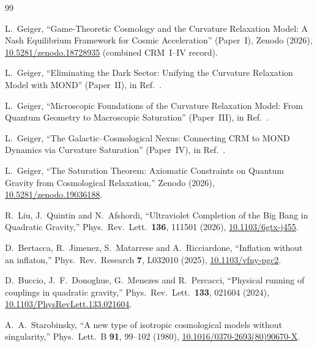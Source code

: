 \documentclass[aps,prd,twocolumn,superscriptaddress,nofootinbib]{revtex4-2}
\begin{document}
\begin{thebibliography}{99}

L.~Geiger,
``Game-Theoretic Cosmology and the Curvature Relaxation Model: A Nash Equilibrium Framework for Cosmic Acceleration'' (Paper~I),
Zenodo (2026), \href{https://doi.org/10.5281/zenodo.18728935}{10.5281/zenodo.18728935} (combined CRM~I--IV record).

L.~Geiger,
``Eliminating the Dark Sector: Unifying the Curvature Relaxation Model with MOND'' (Paper~II),
in Ref.~\cite{Geiger2026}.

L.~Geiger,
``Microscopic Foundations of the Curvature Relaxation Model: From Quantum Geometry to Macroscopic Saturation'' (Paper~III),
in Ref.~\cite{Geiger2026}.

L.~Geiger,
``The Galactic--Cosmological Nexus: Connecting CRM to MOND Dynamics via Curvature Saturation'' (Paper~IV),
in Ref.~\cite{Geiger2026}.

L.~Geiger,
``The Saturation Theorem: Axiomatic Constraints on Quantum Gravity from Cosmological Relaxation,''
Zenodo (2026), \href{https://doi.org/10.5281/zenodo.19036188}{10.5281/zenodo.19036188}.

R.~Liu, J.~Quintin and N.~Afshordi,
``Ultraviolet Completion of the Big Bang in Quadratic Gravity,''
Phys.\ Rev.\ Lett.\ \textbf{136}, 111501 (2026),
\href{https://doi.org/10.1103/6gtx-j455}{10.1103/6gtx-j455}.

D.~Bertacca, R.~Jimenez, S.~Matarrese and A.~Ricciardone,
``Inflation without an inflaton,''
Phys.\ Rev.\ Research \textbf{7}, L032010 (2025),
\href{https://doi.org/10.1103/vfny-pgc2}{10.1103/vfny-pgc2}.

D.~Buccio, J.~F.~Donoghue, G.~Menezes and R.~Percacci,
``Physical running of couplings in quadratic gravity,''
Phys.\ Rev.\ Lett.\ \textbf{133}, 021604 (2024),
\href{https://doi.org/10.1103/PhysRevLett.133.021604}{10.1103/PhysRevLett.133.021604}.

A.~A.~Starobinsky,
``A new type of isotropic cosmological models without singularity,''
Phys.\ Lett.\ B \textbf{91}, 99--102 (1980),
\href{https://doi.org/10.1016/0370-2693(80)90670-X}{10.1016/0370-2693(80)90670-X}.


\end{thebibliography}
\end{document}
